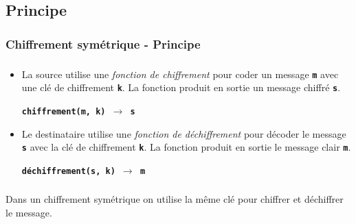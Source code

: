 \documentclass[svgnames,11pt]{beamer}
\begin{document}
\subsection{Principe}
\begin{frame}
    \frametitle{Chiffrement symétrique - Principe}

    \begin{center}
    \end{center}

\end{frame}
\begin{frame}
    \frametitle{}

    \begin{itemize}
        \item<1-> La source utilise une \emph{fonction de chiffrement} pour coder un message \textbf{\texttt{m}} avec une clé de chiffrement \textbf{\texttt{k}}. La fonction produit en sortie un message chiffré \textbf{\texttt{s}}.
              \begin{center}
                  \textbf{\texttt{chiffrement(m, k) $\rightarrow$ s}}
              \end{center}
        \item<2-> Le destinataire utilise une \emph{fonction de déchiffrement} pour décoder le message \textbf{\texttt{s}} avec la clé de chiffrement \textbf{\texttt{k}}. La fonction produit en sortie le message clair \textbf{\texttt{m}}.
              \begin{center}
                  \textbf{\texttt{déchiffrement(s, k) $\rightarrow$ m}}
              \end{center}
    \end{itemize}

\end{frame}
\begin{frame}
    \frametitle{}

    \begin{aretenir}[]
        Dans un chiffrement symétrique on utilise la même clé pour chiffrer et déchiffrer le message.
        \end{aretenir}

\end{frame}
\end{document}
